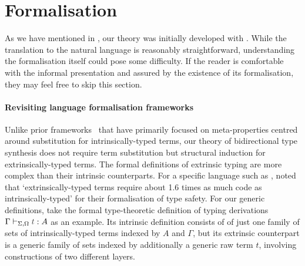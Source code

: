 \documentclass[BiSig.tex]{subfiles}
\begin{document}
\section{Formalisation} \label{sec:formalisation}
As we have mentioned in , our theory was initially developed with \Agda.
While the translation to the natural language is reasonably straightforward, understanding the formalisation itself could pose some difficulty.
If the reader is comfortable with the informal presentation and assured by the existence of its formalisation, they may feel free to skip this section.

\paragraph{Revisiting language formalisation frameworks}
Unlike prior frameworks~\citep{Allais2021,Fiore2022,Ahrens2022} that have primarily focused on meta-properties centred around substitution for intrinsically-typed terms, our theory of bidirectional type synthesis does not require term substitution but structural induction for extrinsically-typed terms.
The formal definitions of extrinsic typing are more complex than their intrinsic counterparts.
For a specific language such as \PCF, \citet{Wadler2022} noted that `extrinsically-typed terms require about 1.6 times as much code as intrinsically-typed' for their formalisation of type safety.
For our generic definitions, take the formal type-theoretic definition of typing derivations $\Gamma \vdash_{\Sigma, \Omega} \isTerm{t} : A$ as an example.
Its intrinsic definition consists of of just one family of sets of intrinsically-typed terms indexed by $A$ and $\Gamma$, but its extrinsic counterpart is a generic family of sets indexed by additionally a generic raw term $t$, involving constructions of two different layers.
\end{document}

